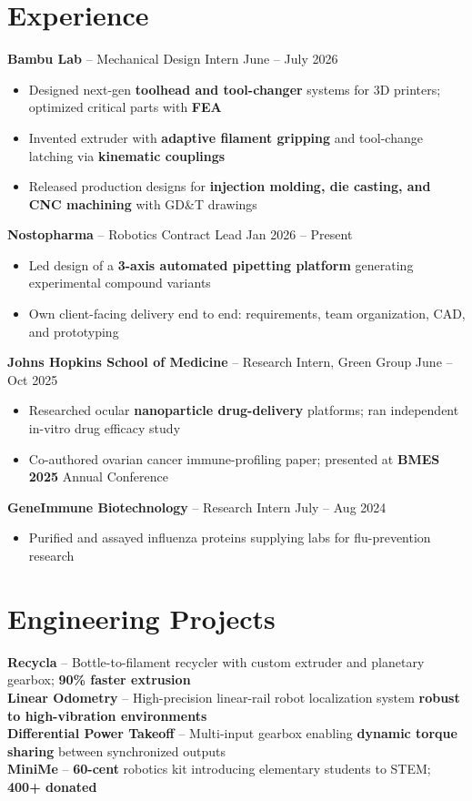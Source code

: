\documentclass[10pt, letterpaper]{article}
\begin{document}
\section{Experience}
    \textbf{Bambu Lab} -- Mechanical Design Intern
    \hfill June -- July 2026
    \begin{itemize}
        \item Designed next-gen \textbf{toolhead and tool-changer} systems for 3D printers; optimized critical parts with \textbf{FEA}
        \item Invented extruder with \textbf{adaptive filament gripping} and tool-change latching via \textbf{kinematic couplings}
        \item Released production designs for \textbf{injection molding, die casting, and CNC machining} with GD\&T drawings
    \end{itemize}
    \textbf{Nostopharma} -- Robotics Contract Lead
    \hfill Jan 2026 -- Present
    \begin{itemize}
        \item Led design of a \textbf{3-axis automated pipetting platform} generating experimental compound variants
        \item Own client-facing delivery end to end: requirements, team organization, CAD, and prototyping
    \end{itemize}
    \textbf{Johns Hopkins School of Medicine} -- Research Intern, Green Group
    \hfill June -- Oct 2025
    \begin{itemize}
        \item Researched ocular \textbf{nanoparticle drug-delivery} platforms; ran independent in-vitro drug efficacy study
        \item Co-authored ovarian cancer immune-profiling paper; presented at \textbf{BMES 2025} Annual Conference
    \end{itemize}
    \textbf{GeneImmune Biotechnology} -- Research Intern
    \hfill July -- Aug 2024
    \begin{itemize}
        \item Purified and assayed influenza proteins supplying labs for flu-prevention research
    \end{itemize}

\section{Engineering Projects}
    \textbf{Recycla} -- Bottle-to-filament recycler with custom extruder and planetary gearbox; \textbf{90\% faster extrusion} \\
    \textbf{Linear Odometry} -- High-precision linear-rail robot localization system \textbf{robust to high-vibration environments} \\
    \textbf{Differential Power Takeoff} -- Multi-input gearbox enabling \textbf{dynamic torque sharing} between synchronized outputs \\
    \textbf{MiniMe} -- \textbf{60-cent} robotics kit introducing elementary students to STEM; \textbf{400+ donated}
\end{document}
